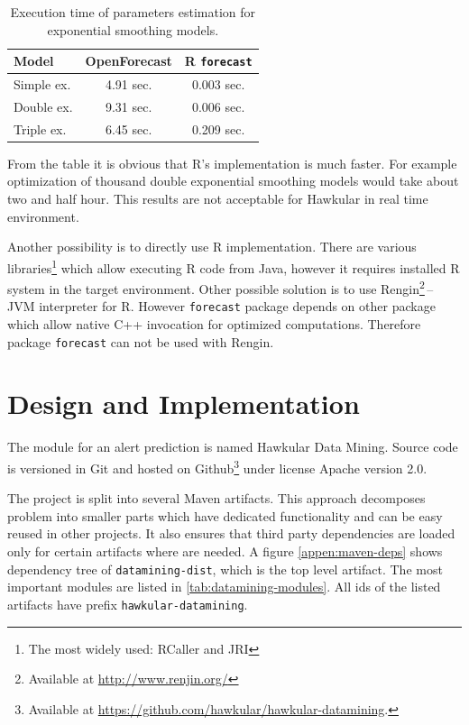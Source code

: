     \begin{table}[h]
        \begin{center}
            \begin{tabular}{l|c|c}
                \textbf{Model} & \textbf{OpenForecast} & \textbf{R \texttt{forecast}} \\ \hline \hline
                Simple ex. & 4.91 sec. & 0.003 sec.\\
                Double ex. & 9.31 sec. & 0.006 sec.\\
                Triple ex. & 6.45 sec. & 0.209 sec.\\
            \end{tabular}
            \caption{Execution time of parameters estimation for exponential smoothing models.}
            \label{tab:open-forecast-perf}
        \end{center}
    \end{table}

    From the table it is obvious that R's implementation is much faster. For example optimization of thousand double
    exponential smoothing models would take about two and half hour. This results are not acceptable for Hawkular in
    real time environment.

    Another possibility is to directly use R implementation. There are various libraries\footnote{The most widely used:
    RCaller and JRI}
    which allow executing R code from Java, however it requires installed R system in the target environment. Other
    possible solution is to use Rengin\footnote{Available at \url{http://www.renjin.org/}}\,--\,JVM interpreter for R.
    However \texttt{forecast} package depends on other package which allow native C++ invocation for optimized
    computations. Therefore package \texttt{forecast} can not be used with Rengin.

\chapter{Design and Implementation} \label{design-impl}
The module for an alert prediction is named Hawkular Data Mining. Source code is versioned in Git and
hosted on Github\footnote{Available at \url{https://github.com/hawkular/hawkular-datamining}.} under
license Apache version 2.0.

The project is split into several Maven artifacts. This approach decomposes problem into smaller parts
which have dedicated functionality and can be easy reused in other projects. It also ensures that
third party dependencies are loaded only for certain artifacts where are needed. A figure \ref{appen:maven-deps}
shows dependency tree of \texttt{datamining-dist}, which is the top level artifact. The most important modules are
listed in \ref{tab:datamining-modules}. All ids of the listed artifacts have prefix \texttt{hawkular-datamining}.

